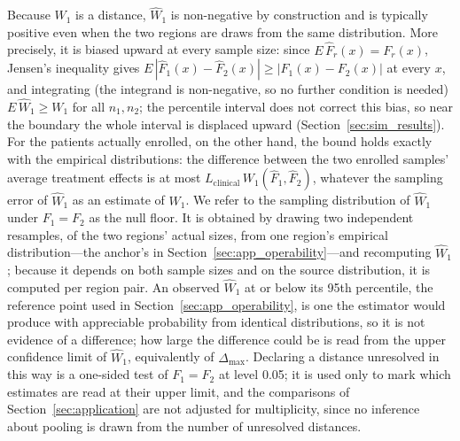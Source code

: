 \documentclass[AMA,Times1COL]{WileyNJDv5}
\begin{document}
Because $W_1$ is a distance, $\widehat{W}_1$ is non-negative by construction and is typically positive even when the two regions are draws from the same distribution. More precisely, it is biased upward at every sample size: since $E\,\hat{F}_r(x) = F_r(x)$, Jensen's inequality gives $E\,|\hat{F}_1(x) - \hat{F}_2(x)| \geq |F_1(x) - F_2(x)|$ at every $x$, and integrating (the integrand is non-negative, so no further condition is needed) $E\,\widehat{W}_1 \geq W_1$ for all $n_1, n_2$; the percentile interval does not correct this bias, so near the boundary the whole interval is displaced upward (Section~\ref{sec:sim_results}). For the patients actually enrolled, on the other hand, the bound holds exactly with the empirical distributions: the difference between the two enrolled samples' average treatment effects is at most $L_{\text{clinical}}\,W_1(\hat{F}_1, \hat{F}_2)$, whatever the sampling error of $\widehat{W}_1$ as an estimate of $W_1$. We refer to the sampling distribution of $\widehat{W}_1$ under $F_1 = F_2$ as the null floor. It is obtained by drawing two independent resamples, of the two regions' actual sizes, from one region's empirical distribution---the anchor's in Section~\ref{sec:app_operability}---and recomputing $\widehat{W}_1$; because it depends on both sample sizes and on the source distribution, it is computed per region pair. An observed $\widehat{W}_1$ at or below its 95th percentile, the reference point used in Section~\ref{sec:app_operability}, is one the estimator would produce with appreciable probability from identical distributions, so it is not evidence of a difference; how large the difference could be is read from the upper confidence limit of $\widehat{W}_1$, equivalently of $\Delta_{\max}$. Declaring a distance unresolved in this way is a one-sided test of $F_1 = F_2$ at level 0.05; it is used only to mark which estimates are read at their upper limit, and the comparisons of Section~\ref{sec:application} are not adjusted for multiplicity, since no inference about pooling is drawn from the number of unresolved distances.
\end{document}
